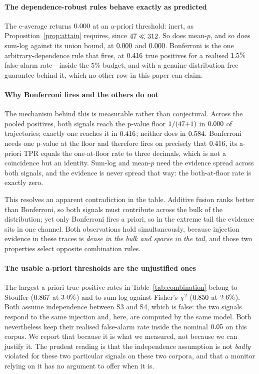 \documentclass[pdflatex,sn-basic]{sn-jnl}%
\theoremstyle{thmstyleone}
\theoremstyle{thmstyletwo}
\theoremstyle{thmstylethree}
\begin{document}
\paragraph{The dependence-robust rules behave exactly as predicted}
The e-average returns $0.000$ at an a-priori threshold: inert, as
Proposition~\ref{prop:attain} requires, since $47 \ll 312$. So does
mean-$p$, and so does sum-log against its union bound, at
$0.000$ and $0.000$. Bonferroni is the one
arbitrary-dependence rule that fires, at $0.416$ true positives for a
realised $1.5\%$ false-alarm rate---inside the $5\%$ budget, and with
a genuine distribution-free guarantee behind it, which no other row in this paper
can claim.

\paragraph{Why Bonferroni fires and the others do not}
The mechanism behind this is measurable rather than conjectural. Across the pooled
positives, both signals reach the p-value floor $1/(47{+}1)$ in $0.000$ of
trajectories; exactly one reaches it in $0.416$; neither does in
$0.584$. Bonferroni needs one p-value at the floor and therefore fires on
precisely that $0.416$, its a-priori TPR equals the one-at-floor rate to
three decimals, which is not a coincidence but an identity. Sum-log and mean-$p$
need the evidence spread across both signals, and the evidence is never spread
that way: the both-at-floor rate is exactly zero.

This resolves an apparent contradiction in the table. Additive fusion ranks better
than Bonferroni, so both signals must contribute across the bulk of the
distribution; yet only Bonferroni fires a priori, so in the extreme tail the
evidence sits in one channel. Both observations hold simultaneously, because
injection evidence in these traces is \emph{dense in the bulk and sparse in the
tail}, and those two properties select opposite combination rules.

\paragraph{The usable a-priori thresholds are the unjustified ones}
The largest a-priori true-positive rates in Table~\ref{tab:combination} belong to
Stouffer ($0.867$ at $3.0\%$) and to sum-log against
Fisher's $\chi^2$ ($0.850$ at $2.6\%$). Both assume
independence between S3 and S4, which is false: the two signals respond to the
same injection and, here, are computed by the same model. Both nevertheless keep
their realised false-alarm rate inside the nominal $0.05$ on this corpus. We
report that because it is what we measured, not because we can justify it. The
prudent reading is that the independence assumption is not \emph{badly} violated
for these two particular signals on these two corpora, and that a monitor relying
on it has no argument to offer when it is.
\end{document}
